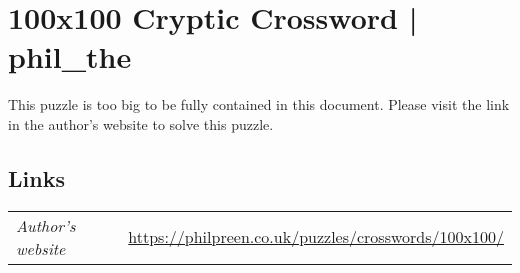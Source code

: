 \section[100x100 Cryptic Crossword | phil\_the {[\emph{Cryptic Crossword}]}]{100x100 Cryptic Crossword | {\normalfont phil\_the}}
\label{sec:07-100x100-cryptic-crossword-phil-the}

This puzzle is too big to be fully contained in this document. Please visit the link in the author's website
to solve this puzzle.

\subsection*{Links}
\begin{tabularx}{\textwidth}{l X}
\emph{Author's website} & \url{https://philpreen.co.uk/puzzles/crosswords/100x100/} \\
\end{tabularx}
\pagebreak
